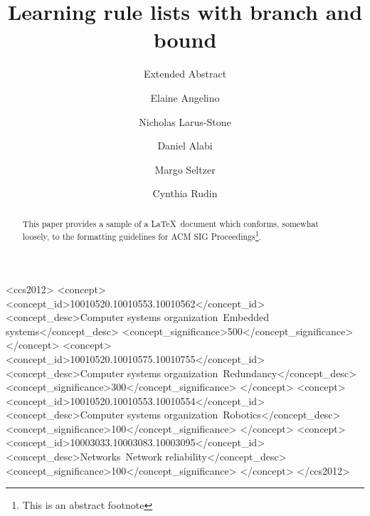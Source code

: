 \documentclass[sigconf]{acmart}
\begin{document}
\title{Learning rule lists with branch and bound}
\subtitle{Extended Abstract}


\author{Elaine Angelino}

\author{Nicholas Larus-Stone}

\author{Daniel Alabi}

\author{Margo Seltzer}

\author{Cynthia Rudin}

\renewcommand{\shortauthors}{E. Angelino et al.}


\begin{abstract}
This paper provides a sample of a \LaTeX\ document which conforms,
somewhat loosely, to the formatting guidelines for
ACM SIG Proceedings\footnote{This is an abstract footnote}. 
\end{abstract}

%
%
\begin{CCSXML}
<ccs2012>
 <concept>
  <concept_id>10010520.10010553.10010562</concept_id>
  <concept_desc>Computer systems organization~Embedded systems</concept_desc>
  <concept_significance>500</concept_significance>
 </concept>
 <concept>
  <concept_id>10010520.10010575.10010755</concept_id>
  <concept_desc>Computer systems organization~Redundancy</concept_desc>
  <concept_significance>300</concept_significance>
 </concept>
 <concept>
  <concept_id>10010520.10010553.10010554</concept_id>
  <concept_desc>Computer systems organization~Robotics</concept_desc>
  <concept_significance>100</concept_significance>
 </concept>
 <concept>
  <concept_id>10003033.10003083.10003095</concept_id>
  <concept_desc>Networks~Network reliability</concept_desc>
  <concept_significance>100</concept_significance>
 </concept>
</ccs2012>  
\end{CCSXML}
\end{document}
